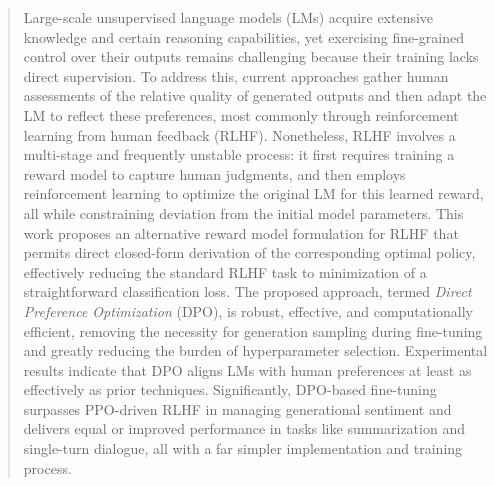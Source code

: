 \begin{abstract}
Large-scale unsupervised language models (LMs) acquire extensive knowledge and certain reasoning capabilities, yet exercising fine-grained control over their outputs remains challenging because their training lacks direct supervision. To address this, current approaches gather human assessments of the relative quality of generated outputs and then adapt the LM to reflect these preferences, most commonly through reinforcement learning from human feedback (RLHF). Nonetheless, RLHF involves a multi-stage and frequently unstable process: it first requires training a reward model to capture human judgments, and then employs reinforcement learning to optimize the original LM for this learned reward, all while constraining deviation from the initial model parameters. This work proposes an alternative reward model formulation for RLHF that permits direct closed-form derivation of the corresponding optimal policy, effectively reducing the standard RLHF task to minimization of a straightforward classification loss. The proposed approach, termed \textit{Direct Preference Optimization} (DPO), is robust, effective, and computationally efficient, removing the necessity for generation sampling during fine-tuning and greatly reducing the burden of hyperparameter selection. Experimental results indicate that DPO aligns LMs with human preferences at least as effectively as prior techniques. Significantly, DPO-based fine-tuning surpasses PPO-driven RLHF in managing generational sentiment and delivers equal or improved performance in tasks like summarization and single-turn dialogue, all with a far simpler implementation and training process.
\end{abstract}

